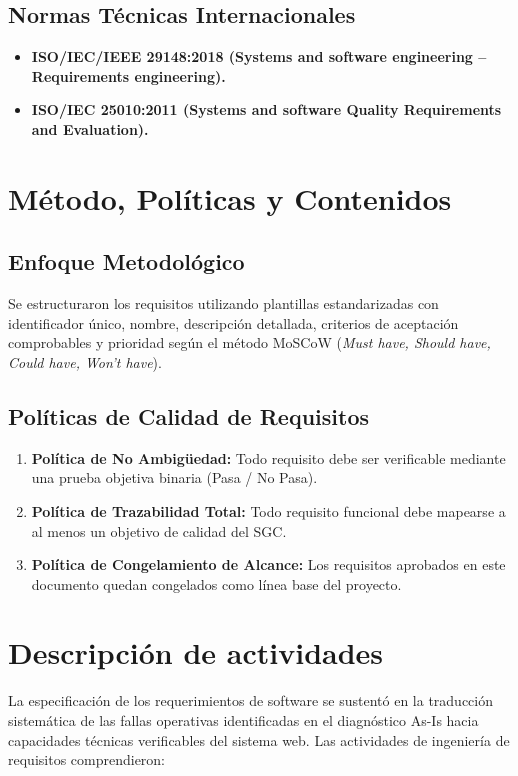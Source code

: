 \documentclass[12pt,a4paper]{article}
\begin{document}
\subsection{Normas Técnicas Internacionales}
\begin{itemize}[leftmargin=1.5em, itemsep=2pt]
    \item \textbf{ISO/IEC/IEEE 29148:2018 (Systems and software engineering -- Requirements engineering).}
    \item \textbf{ISO/IEC 25010:2011 (Systems and software Quality Requirements and Evaluation).}
\end{itemize}

\section{Método, Políticas y Contenidos}
\subsection{Enfoque Metodológico}
Se estructuraron los requisitos utilizando plantillas estandarizadas con identificador único, nombre, descripción detallada, criterios de aceptación comprobables y prioridad según el método MoSCoW (\textit{Must have, Should have, Could have, Won't have}).

\subsection{Políticas de Calidad de Requisitos}
\begin{enumerate}[leftmargin=1.5em, itemsep=2pt]
    \item \textbf{Política de No Ambigüedad:} Todo requisito debe ser verificable mediante una prueba objetiva binaria (Pasa / No Pasa).
    \item \textbf{Política de Trazabilidad Total:} Todo requisito funcional debe mapearse a al menos un objetivo de calidad del SGC.
    \item \textbf{Política de Congelamiento de Alcance:} Los requisitos aprobados en este documento quedan congelados como línea base del proyecto.
\end{enumerate}

\section{Descripción de actividades}
La especificación de los requerimientos de software se sustentó en la traducción sistemática de las fallas operativas identificadas en el diagnóstico As-Is hacia capacidades técnicas verificables del sistema web. Las actividades de ingeniería de requisitos comprendieron:
\end{document}
